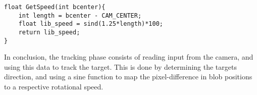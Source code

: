 \begin{minipage}[H]{\linewidth}
\begin{lstlisting}[caption = Determine speed to rotate using a sine function, label = GetZeSpeed] 
float GetSpeed(int bcenter){
    int length = bcenter - CAM_CENTER;
    float lib_speed = sind(1.25*length)*100;
    return lib_speed;
}
\end{lstlisting}
\end{minipage}

In conclusion, the tracking phase consists of reading input from the camera, and
using this data to track the target. This is done by determining the targets
direction, and using a sine function to map the pixel-difference in blob
positions to a respective rotational speed.
